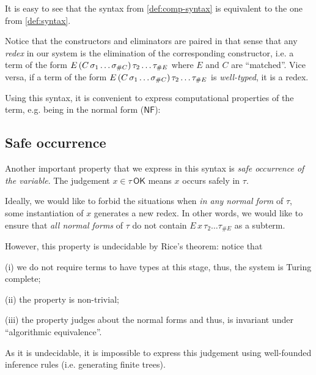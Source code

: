 \documentclass[a4,natbib=false]{article}
\newcommand{\narg}[1]{\#{#1}}
\newcommand{\judgeSnf}[1]{{#1}\,\mathsf{NF}}
\newcommand{\judgeSatom}[1]{{#1}\,\mathsf{ATOM}}
\newcommand{\judgeSok}[2]{{#1} \in {#2}\,\mathsf{OK}}
\newcommand{\Infer}[3]{\inferrule*[right={#1}]{#2}{#3}}
\begin{document}
It is easy to see that the syntax from \cref{def:comp-syntax} is equivalent to
the one from \cref{def:syntax}.

Notice that the constructors and eliminators are paired in that sense that any
\emph{redex} in our system is the elimination of the corresponding constructor,
i.e. a term of the form $E\,(\fullterm{C}{\sigma})\, \tau_2 \dots
\tau_{\narg{E}}$ where $E$ and $C$ are ``matched''.
Vice versa, if a term of the form
$E\,(\fullterm{C}{\sigma})\, \tau_2 \dots \tau_{\narg{E}}$ is
\emph{well-typed}, it is a redex. 

Using this syntax, it is convenient to express computational properties of
the term, e.g. being in the normal form ($\mathsf{NF}$):


\subsection{Safe occurrence}

Another important property that we express in this syntax is \emph{safe
  occurrence of the variable}. The judgement $\judgeSok{x}{\tau}$ means $x$
occurs safely in $\tau$.

Ideally, we would like to forbid the situations when \emph{in any normal form}
of $\tau$, some instantiation of $x$ generates a new redex. In other words, we
would like to ensure that
\emph{all normal forms} of $\tau$ do not contain $E \, x \, \tau_2 \dots
\tau_{\narg{E}}$ as a subterm.

However, this property is undecidable by Rice's theorem: notice that
\begin{enumerate*}

\item[(i)] we do not require terms to have types at this stage, thus, the
  system is Turing complete;

\item[(ii)] the property is non-trivial;

\item[(iii)] the property judges about the normal forms and thus, is invariant
  under ``algorithmic equivalence''.
\end{enumerate*}
As it is undecidable, it is impossible to express this judgement using
well-founded inference rules (i.e. generating finite trees).
\end{document}
